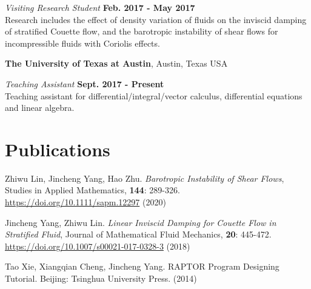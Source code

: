 \documentclass[margin,line]{res}
\begin{document}
\begin{resume}

{\em Visiting Research Student} \hfill {\bf Feb. 2017 - May 2017}\\
Research includes the effect of density variation of fluids on the inviscid damping of stratified Couette flow, and the barotropic instability of shear flows for incompressible fluids with Coriolis effects.

{\bf The University of Texas at Austin}, Austin, Texas USA

{\em Teaching Assistant} \hfill {\bf Sept. 2017 - Present}\\
Teaching assistant for differential/integral/vector calculus, differential equations and linear algebra.

\section{\sc Publications}

\begin{etaremune}[leftmargin=0.02in, start=3]
    \item Zhiwu Lin, Jincheng Yang, Hao Zhu. \textit{Barotropic Instability of Shear Flows}, Studies in Applied Mathematics, \textbf{144}: 289-326. 
    \href{https://doi.org/10.1111/sapm.12297}{https://doi.org/10.1111/sapm.12297} (2020) 
    \item Jincheng Yang, Zhiwu Lin. \textit{Linear Inviscid Damping for Couette Flow in Stratified Fluid}, Journal of Mathematical Fluid Mechanics, \textbf{20}: 445-472. \href{https://doi.org/10.1007/s00021-017-0328-3}{https://doi.org/10.1007/s00021-017-0328-3} (2018)
    \item Tao Xie, Xiangqian Cheng, Jincheng Yang. RAPTOR Program Designing Tutorial. Beijing: Tsinghua University Press. (2014)
\end{etaremune}


\end{resume}
\end{document}
